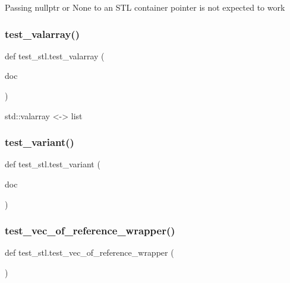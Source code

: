 \begin{DoxyVerb}Passing nullptr or None to an STL container pointer is not expected to work\end{DoxyVerb}
 \mbox{\label{namespacetest__stl_a967115fc8bb4608112859b1aac93ae53}} 
\subsubsection{\texorpdfstring{test\_valarray()}{test\_valarray()}}
{\footnotesize\ttfamily def test\+\_\+stl.\+test\+\_\+valarray (\begin{DoxyParamCaption}\item[{}]{doc }\end{DoxyParamCaption})}

\begin{DoxyVerb}std::valarray <-> list\end{DoxyVerb}
 \mbox{\label{namespacetest__stl_a7e1741108c50e2513d8f444427767ba8}} 
\subsubsection{\texorpdfstring{test\_variant()}{test\_variant()}}
{\footnotesize\ttfamily def test\+\_\+stl.\+test\+\_\+variant (\begin{DoxyParamCaption}\item[{}]{doc }\end{DoxyParamCaption})}

\mbox{\label{namespacetest__stl_a579b9179d401bdb04bd7b8d3501b75c6}} 
\subsubsection{\texorpdfstring{test\_vec\_of\_reference\_wrapper()}{test\_vec\_of\_reference\_wrapper()}}
{\footnotesize\ttfamily def test\+\_\+stl.\+test\+\_\+vec\+\_\+of\+\_\+reference\+\_\+wrapper (\begin{DoxyParamCaption}{ }\end{DoxyParamCaption})}

